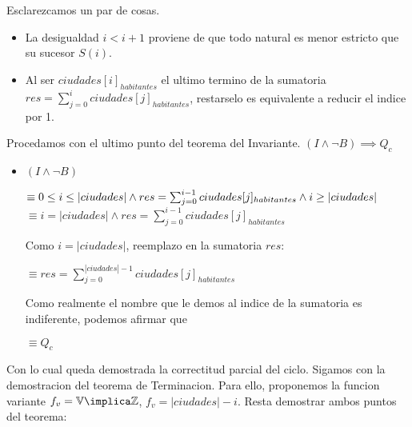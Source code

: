 \documentclass[10pt,a4paper]{article}
\begin{document}
Esclarezcamos un par de cosas.
\begin{itemize}
	\item La desigualdad $i<i+1$ proviene de que todo natural es menor estricto que su sucesor $S(i)$.
	\item Al ser $ciudades[i]_{habitantes}$ el ultimo termino de la sumatoria $res =\sum_{j=0}^{i}ciudades[j]_{habitantes}$, restarselo es equivalente a reducir el indice por 1.
\end{itemize}
Procedamos con el ultimo punto del teorema del Invariante.
\newline \newline
$(I \wedge \neg B) \implies Q_c$
\begin{itemize}
	\item $(I \wedge \neg B)$
	      \begin{adjustwidth}{2em}{}
		      $\equiv 0 \leq i \leq |ciudades| \wedge res = \sum_{j=0}^{i-1} ciudades[j]_{habitantes} \wedge i \geq |ciudades| \newline$
		      $\equiv i = |ciudades| \wedge res = \sum_{j=0}^{i-1} ciudades[j]_{habitantes}$
	      \end{adjustwidth}
	      Como $i=|ciudades|$, reemplazo en la sumatoria $res$:
	      \begin{adjustwidth}{2em}{}
		      $\equiv res = \sum_{j = 0}^{|ciudades|-1}ciudades[j]_{habitantes}$
	      \end{adjustwidth}
	      Como realmente el nombre que le demos al indice de la sumatoria es indiferente, podemos afirmar que  
	      \begin{adjustwidth}{2em}{}
		      $\equiv Q_c$
	      \end{adjustwidth}
\end{itemize}

Con lo cual queda demostrada la correctitud parcial del ciclo. Sigamos con la demostracion del teorema de Terminacion. Para ello, proponemos la funcion variante $f_v = \mathbb{V} \implica \mathbb{Z}$, $f_v = |ciudades| - i$. Resta demostrar ambos puntos del teorema:

\end{document}
